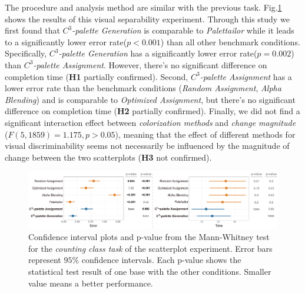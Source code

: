 {
The procedure and analysis method are similar with the previous task. Fig.\ref{fig:counting-results} shows the results of this visual separability experiment.
Through this study we first found that \emph{$C^3$-palette Generation} is comparable to \emph{Palettailor} while it leads to a significantly lower error rate(\emph{$p<0.001$}) than all other benchmark conditions. Specifically, \emph{$C^3$-palette Generation} has a significantly lower error rate(\emph{$p=0.002$}) than \emph{$C^3$-palette Assignment}. However, there's no significant difference on completion time (\textbf{H1} partially confirmed).
Second, \emph{$C^3$-palette Assignment} has a lower error rate than the benchmark conditions (\emph{Random Assignment}, \emph{Alpha Blending}) and is comparable to \emph{Optimized Assignment}, but there's no significant difference on completion time (\textbf{H2} partially confirmed).
Finally, we did not find a significant interaction effect between \emph{colorization methods} and \emph{change magnitude} ($F(5, 1859) = 1.175, p > 0.05$), meaning that the effect of different methods for visual discriminability seems not necessarily be influenced by the magnitude of change between the two scatterplots (\textbf{H3} not confirmed).

\begin{figure}[!tb]
\centering
\includegraphics[width=1\linewidth]{figures/counting-results.pdf}
\caption{Confidence interval plots and p-value from the Mann-Whitney test for the \emph{counting class task} of the scatterplot experiment. Error bars represent $95\%$ confidence intervals. Each p-value shows the statistical test result of one base with the other conditions. Smaller value means a better performance.}
\vspace*{-3mm}
\label{fig:counting-results}
\end{figure}

}
